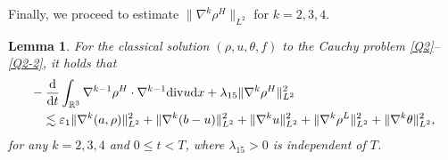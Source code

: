 \documentclass[reqno,11pt]{amsart}
\theoremstyle{plain}
\newtheorem{lem}[thm]{Lemma}
\numberwithin{equation}{section}
\newcommand{\eps}{{\varepsilon}}
\begin{document}
Finally, we proceed to estimate $\|\nabla^k \rho^H\|_{L^2}$ for $k=2,3,4$.

\begin{lem}\label{L5.5}
For  the classical solution $(\rho, u,\theta,f)$ to the Cauchy problem \eqref{Q2}--\eqref{Q2-2}, it holds that 
\begin{align}\label{G5.42}
& -\frac{\mathrm{d}}{\mathrm{d} t}   \int_{\mathbb{R}^3} \nabla^{k-1} \rho^H \cdot \nabla^{k-1} {\rm div}u \mathrm{d} x+\lambda_{15}\|\nabla^{k}  \rho^H\|_{L^2}^2\nonumber \\
&\quad  \lesssim  \eps_1\|\nabla^{k} (a,\rho)\|_{L^2}^2+\|\nabla^{k}(b-u)\|_{L^2}^2+\|\nabla  ^{k}u\|_{L^2}^2+\|\nabla^{k} \rho^L\|_{L^2}^2+\|\nabla^k \theta\|_{L^2}^2 ,
\end{align}
for any $k=2,3,4$ and $0 \leq t < T$, where $\lambda_{15}>0$ is independent of  $T$. 
\end{lem}
\end{document}
